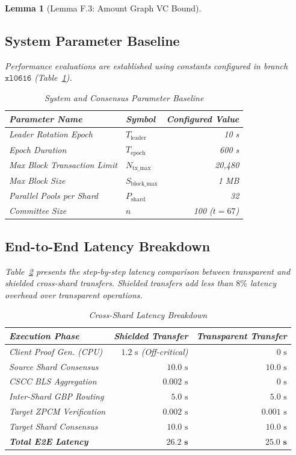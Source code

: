\documentclass[journal,10pt,twocolumn]{IEEEtran}
\newtheorem{lemma}[theorem]{Lemma}
\theoremstyle{definition}
\theoremstyle{remark}
\begin{document}
\begin{lemma}[Lemma F.3: Amount Graph VC Bound]
\subsection{System Parameter Baseline}
Performance evaluations are established using constants configured in branch $\mathtt{xl0616}$ (Table~\ref{tab:system_params}).

\begin{table}[h]
\centering
\caption{System and Consensus Parameter Baseline}
\label{tab:system_params}
\begin{tabular}{llr}
\toprule
\textbf{Parameter Name} & \textbf{Symbol} & \textbf{Configured Value} \\
\midrule
Leader Rotation Epoch & $T_{\text{leader}}$ & 10 s \\
Epoch Duration & $T_{\text{epoch}}$ & 600 s \\
Max Block Transaction Limit & $N_{\text{tx\_max}}$ & 20,480 \\
Max Block Size & $S_{\text{block\_max}}$ & 1 MB \\
Parallel Pools per Shard & $P_{\text{shard}}$ & 32 \\
Committee Size & $n$ & 100 ($t=67$) \\
\bottomrule
\end{tabular}
\end{table}

\subsection{End-to-End Latency Breakdown}
Table~\ref{tab:latency_breakdown} presents the step-by-step latency comparison between transparent and shielded cross-shard transfers. Shielded transfers add less than $8\%$ latency overhead over transparent operations.

\begin{table}[h]
\centering
\caption{Cross-Shard Latency Breakdown}
\label{tab:latency_breakdown}
\begin{tabular}{lrr}
\toprule
\textbf{Execution Phase} & \textbf{Shielded Transfer} & \textbf{Transparent Transfer} \\
\midrule
Client Proof Gen. (CPU) & $1.2\text{ s}$ (Off-critical) & $0\text{ s}$ \\
Source Shard Consensus & $10.0\text{ s}$ & $10.0\text{ s}$ \\
CSCC BLS Aggregation & $0.002\text{ s}$ & $0\text{ s}$ \\
Inter-Shard GBP Routing & $5.0\text{ s}$ & $5.0\text{ s}$ \\
Target ZPCM Verification & $0.002\text{ s}$ & $0.001\text{ s}$ \\
Target Shard Consensus & $10.0\text{ s}$ & $10.0\text{ s}$ \\
\midrule
\textbf{Total E2E Latency} & $\mathbf{26.2\text{ s}}$ & $\mathbf{25.0\text{ s}}$ \\
\bottomrule
\end{tabular}
\end{table}


\end{lemma}
\end{document}
